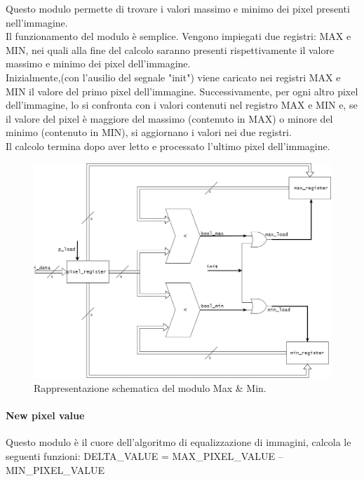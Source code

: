 Questo modulo permette di trovare i valori massimo e minimo dei pixel presenti nell'immagine.\\
Il funzionamento del modulo è semplice. Vengono impiegati due registri: MAX e MIN, nei quali alla fine del calcolo saranno presenti rispettivamente il valore massimo e minimo dei pixel dell'immagine.\\
Inizialmente,(con l'ausilio del segnale "init") viene caricato nei registri MAX e MIN il valore del primo pixel dell'immagine. Successivamente, per ogni altro pixel dell'immagine, lo si confronta con i valori contenuti nel registro MAX e MIN e, se il valore del pixel è maggiore del massimo (contenuto in MAX) o minore del minimo (contenuto in MIN), si aggiornano i valori nei due registri.\\
Il calcolo termina dopo aver letto e processato l'ultimo pixel dell'immagine.

\begin{figure}[h!] %
  \includegraphics[width=\linewidth]{max_min_module}
  \caption{Rappresentazione schematica del modulo Max \& Min.}
  \label{fig:maxMin}
\end{figure}

\paragraph{New pixel value\\}
Questo modulo è il cuore dell'algoritmo di equalizzazione di immagini, calcola le seguenti funzioni:
\doublespacing
\singlespacing
DELTA\_VALUE = MAX\_PIXEL\_VALUE – MIN\_PIXEL\_VALUE

